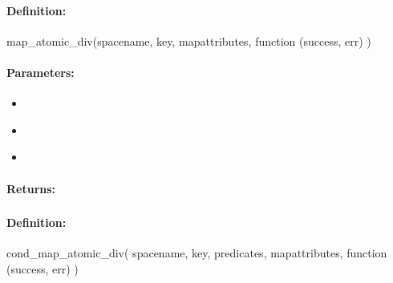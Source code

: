 \paragraph{Definition:}
\begin{javascriptcode}
map_atomic_div(spacename, key, mapattributes, function (success, err) {})
\end{javascriptcode}
\paragraph{Parameters:}
\begin{itemize}[noitemsep]
\item {}\\

\item {}\\

\item {}\\

\end{itemize}

\paragraph{Returns:}


\pagebreak
\subsubsection{}
\label{api:nodejs:cond_map_atomic_div}


\paragraph{Definition:}
\begin{javascriptcode}
cond_map_atomic_div(
        spacename, key, predicates, mapattributes, function (success, err) {})
\end{javascriptcode}
